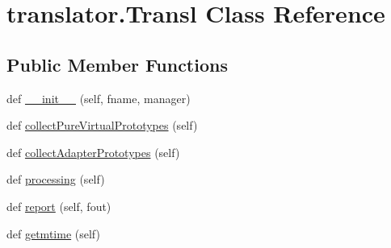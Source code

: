 \hypertarget{classtranslator_1_1_transl}{}\section{translator.\+Transl Class Reference}
\label{classtranslator_1_1_transl}
\subsection*{Public Member Functions}
\begin{DoxyCompactItemize}
\item 
def \mbox{\hyperlink{classtranslator_1_1_transl_a8c6390ddf78fb1f4e22fb46f6c585fe5}{\+\_\+\+\_\+init\+\_\+\+\_\+}} (self, fname, manager)
\item 
def \mbox{\hyperlink{classtranslator_1_1_transl_a9a11ebef292c720a8dada81e409df3bd}{collect\+Pure\+Virtual\+Prototypes}} (self)
\item 
def \mbox{\hyperlink{classtranslator_1_1_transl_a0aa3555a3d4ff434bd54af94c922159a}{collect\+Adapter\+Prototypes}} (self)
\item 
def \mbox{\hyperlink{classtranslator_1_1_transl_af3735bfc96ce58cc9c035d8091bac85b}{processing}} (self)
\item 
def \mbox{\hyperlink{classtranslator_1_1_transl_a70179583414dbb92f9875af3ae2ee5ba}{report}} (self, fout)
\item 
def \mbox{\hyperlink{classtranslator_1_1_transl_affb114b804b7bccb4ba4dd5b492009f7}{getmtime}} (self)
\end{DoxyCompactItemize}
